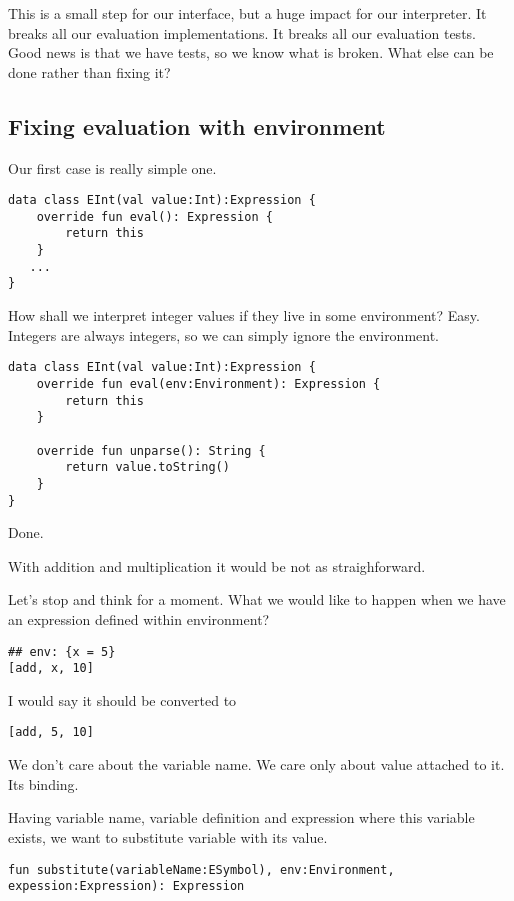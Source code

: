 \documentclass[11pt]{article}
\begin{document}
This is a small step for our interface, but a huge impact for our interpreter.
It breaks all our evaluation implementations.
It breaks all our evaluation tests.
Good news is that we have tests, so we know what is broken.
What else can be done rather than fixing it?

\subsection{Fixing evaluation with environment}
\label{sec:orgee10107}
Our first case is really simple one.
\begin{verbatim}
data class EInt(val value:Int):Expression {
    override fun eval(): Expression {
        return this
    }
   ...
}
\end{verbatim}

How shall we interpret integer values if they live in some environment?
Easy. Integers are always integers, so we can simply ignore the environment.

\begin{verbatim}
data class EInt(val value:Int):Expression {
    override fun eval(env:Environment): Expression {
        return this
    }

    override fun unparse(): String {
        return value.toString()
    }
}
\end{verbatim}

Done.

With addition and multiplication it would be not as straighforward.

Let's stop and think for a moment.
What we would like to happen when we have an expression defined within environment?
\begin{verbatim}
## env: {x = 5}
[add, x, 10]
\end{verbatim}

I would say it should be converted to
\begin{verbatim}
[add, 5, 10]
\end{verbatim}
We don't care about the variable name. We care only about value attached to it. Its binding.

Having variable name, variable definition and expression where this variable exists, we want to substitute variable with its value.

\begin{verbatim}
fun substitute(variableName:ESymbol), env:Environment, expession:Expression): Expression
\end{verbatim}
\end{document}
